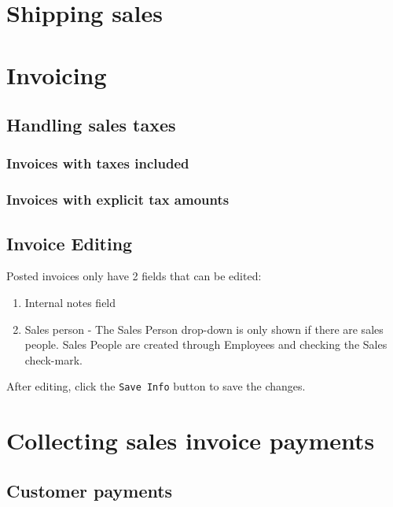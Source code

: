 \chapter{Shipping sales}
\label{cha-shipping-sales}



\chapter{Invoicing}
\label{cha-starting-invoicing}

\section{Handling sales taxes}
\label{sec-invoicing-sales-tax}

\subsection{Invoices with taxes included}
\label{subsec-sales-tax-included}

\subsection{Invoices with explicit tax amounts}
\label{subsec-sales-tax-explicit-amount}

\section{Invoice Editing}
\label{sec-invoicing-editing}

Posted invoices only have 2 fields that can be edited:
\begin{enumerate}
\item Internal notes field
\item Sales person - The Sales Person drop-down is only shown if there are sales people. Sales People are created through Employees and checking the Sales check-mark.
\end{enumerate}
After editing, click the  \texttt{Save Info} button to save the changes.

\chapter{Collecting sales invoice payments}
\label{cha-starting-sales-customer-payments}

\section{Customer payments}
\label{sec-starting-sales-customer-payments}

